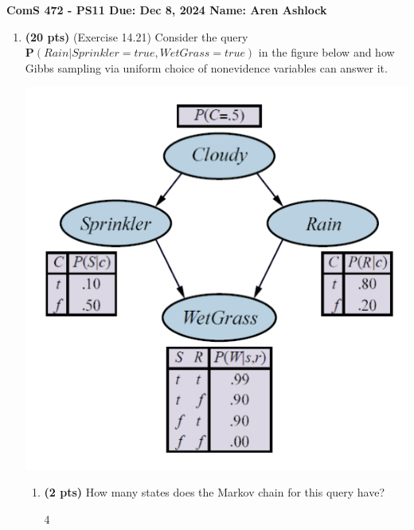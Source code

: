 \documentclass{article}
\begin{document}
\noindent\textbf{ComS 472 - PS11 \quad Due: Dec 8, 2024 \quad Name: Aren Ashlock}

\begin{enumerate}


\item \textbf{(20 pts)} (Exercise 14.21) Consider the query $\mathbf{P}(Rain|Sprinkler=true, WetGrass=true)$ in the figure below and how Gibbs sampling via uniform choice of nonevidence variables can answer it.

\begin{center}
    \includegraphics[scale=0.5]{472-PS11-Q1}
\end{center}

\begin{enumerate}[label=($\alph*$)]

   
    \item \textbf{(2 pts)} How many states does the Markov chain for this query have?

    \color{blue}
        4
    \color{black}



\end{enumerate}
\end{enumerate}
\end{document}
